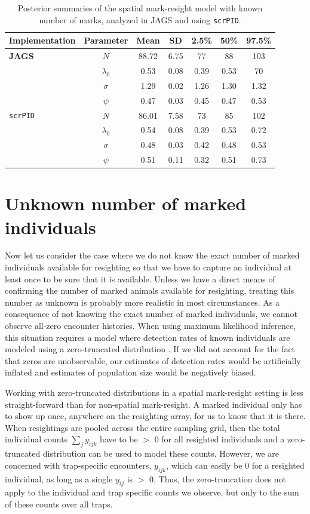 \begin{table}
\label{partialID.tab.knownm}
\centering
  \caption{Posterior summaries of the spatial mark-resight model with known number of marks, analyzed in JAGS and using {\tt scrPID}.}
  \begin{tabular}{lcccccc}
             \hline
  Implementation & Parameter &   Mean &   SD &  2.5\% & 50\% & 97.5\% \\
           \hline
{\bf JAGS} & $N$      & 88.72 & 6.75 & 77 & 88 & 103 \\
			& $\lambda_0$  &  0.53 & 0.08 & 0.39 & 0.53 & 70 \\
			& $\sigma$ &  1.29 & 0.02 & 1.26 & 1.30 & 1.32 \\
			& $\psi$    & 0.47   & 0.03  & 0.45  & 0.47 & 0.53  \\
		\hline
{\tt scrPID}& $N$      & 86.01 & 7.58 & 73 & 85 & 102 \\
			& $\lambda_0$  &  0.54 & 0.08 & 0.39 & 0.53 & 0.72 \\
			& $\sigma$ &  0.48 & 0.03 & 0.42 & 0.48 & 0.53 \\
			& $\psi$    & 0.51   & 0.11  & 0.32  & 0.51 & 0.73 \\
			\hline
  \end{tabular}
\end{table}


\section {Unknown number of marked individuals}
\label{partialID.sec.unknown}
Now let us consider the case where we do not know the exact number of
marked individuals available for resighting so that we have to capture
an individual at least once to be sure that it is available. Unless we
have a direct means of confirming the number of marked animals
available for resighting, treating this number as unknown is probably
more realistic
 in most circumstances. As a consequence of not knowing the exact number of marked individuals, we cannot observe all-zero encounter histories. When using maximum likelihood inference, this situation requires a model where detection rates of known individuals are modeled using a zero-truncated distribution \citep{mcclintock_etal:2009biometrics}. If we did not account for the fact that zeros are unobservable, our estimates of detection rates would be artificially inflated and estimates of population size would be negatively biased.

Working with zero-truncated distributions in a spatial mark-resight
setting is less straight-forward than for non-spatial mark-resight. A
marked individual only has to show up once, anywhere on the resighting
array,
for us to know that it is there. When resightings are pooled
across the entire sampling grid, then the total individual counts $\sum_j y_{ijk}$ have to be $>$ 0 for all resighted individuals and a zero-truncated distribution can be used to model these counts. However, we are concerned with trap-specific encounters, $y_{ijk}$, which can easily be 0 for a resighted individual, as long as a single $y_{ij}$ is $>$ 0. Thus, the zero-truncation does not apply to the individual and trap specific counts we observe, but only to the sum of these counts over all traps.

